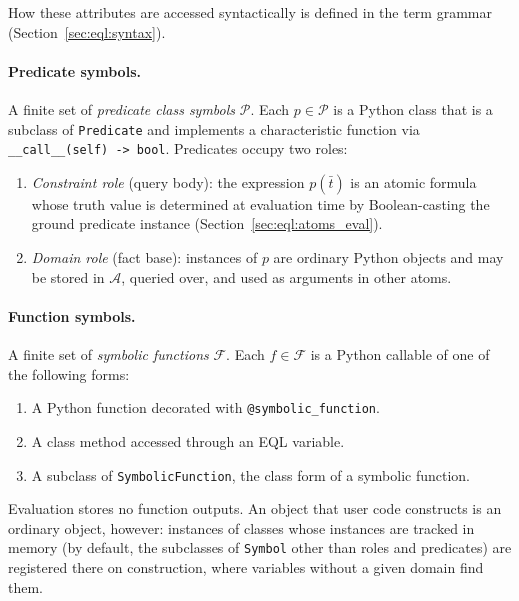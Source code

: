 \documentclass[11pt, a4paper]{article}
\theoremstyle{plain}
\theoremstyle{definition}
\theoremstyle{remark}
\begin{document}
\noindent
How these attributes are accessed syntactically is defined in the term grammar (Section~\ref{sec:eql:syntax}).

\paragraph{Predicate symbols.}
A finite set of \emph{predicate class symbols} $\mathcal{P}$.  Each $p \in \mathcal{P}$ is a
Python class that is a subclass of \texttt{Predicate} and implements a characteristic function
via \texttt{\_\_call\_\_(self) -> bool}.  Predicates occupy two roles:

\begin{enumerate}
  \item \emph{Constraint role} (query body): the expression $p(\bar{t})$ is an atomic formula
        whose truth value is determined at evaluation time by Boolean-casting the ground
        predicate instance (Section~\ref{sec:eql:atoms_eval}).

  \item \emph{Domain role} (fact base): instances of $p$ are ordinary Python objects and may be
        stored in $\mathcal{A}$, queried over, and used as arguments in other atoms.
\end{enumerate}

\paragraph{Function symbols.}
A finite set of \emph{symbolic functions} $\mathcal{F}$.  Each $f \in \mathcal{F}$ is a
Python callable of one of the following forms:
\begin{enumerate}
    \item A Python function decorated with \texttt{@symbolic\_function}.
    \item A class method accessed through an EQL variable.
    \item A subclass of \texttt{SymbolicFunction}, the class form of a symbolic function.
\end{enumerate}
\noindent
Evaluation stores no function outputs.  An object that user code constructs is an ordinary
object, however: instances of classes whose instances are tracked in memory (by default, the
subclasses of \texttt{Symbol} other than roles and predicates) are registered there on
construction, where variables without a given domain find them.
\newline
\end{document}
